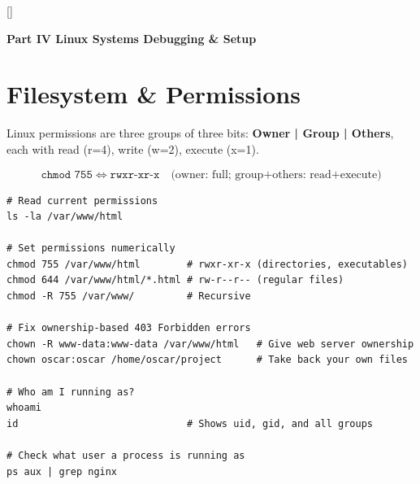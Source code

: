 \documentclass[11pt, letterpaper]{article}
\newcommand{\greensections}{%
  \titleformat{\section}{\large\bfseries\color{sectiongreen}}{}{0em}{}[\color{sectiongreen}\titlerule]%
  \titleformat{\subsection}{\normalsize\bfseries\color{sectiongreen!80!black}}{}{0em}{}%
}
\newcommand{\partbanner}[3]{%
  \begin{tcolorbox}[colback=#1, colframe=#2, boxrule=1.2pt, arc=4pt,
    left=8pt, right=8pt, top=6pt, bottom=6pt]
    \begin{center}{\LARGE\bfseries #3}\end{center}
  \end{tcolorbox}%
}
\begin{document}
\newpage

\greensections
{}
\partbanner{part2bg}{sectiongreen}{Part IV \quad Linux Systems Debugging \& Setup}

\vspace{8pt}

\section*{Filesystem \& Permissions}

Linux permissions are three groups of three bits: \textbf{Owner | Group | Others}, each with read (r=4), write (w=2), execute (x=1).

\[
  \texttt{chmod 755} \;\Longleftrightarrow\; \texttt{rwxr-xr-x}
  \quad\text{(owner: full; group+others: read+execute)}
\]

\begin{lstlisting}[style=shell, caption={Permissions and ownership}]
# Read current permissions
ls -la /var/www/html

# Set permissions numerically
chmod 755 /var/www/html        # rwxr-xr-x (directories, executables)
chmod 644 /var/www/html/*.html # rw-r--r-- (regular files)
chmod -R 755 /var/www/         # Recursive

# Fix ownership-based 403 Forbidden errors
chown -R www-data:www-data /var/www/html   # Give web server ownership
chown oscar:oscar /home/oscar/project      # Take back your own files

# Who am I running as?
whoami
id                             # Shows uid, gid, and all groups

# Check what user a process is running as
ps aux | grep nginx
\end{lstlisting}
\end{document}
